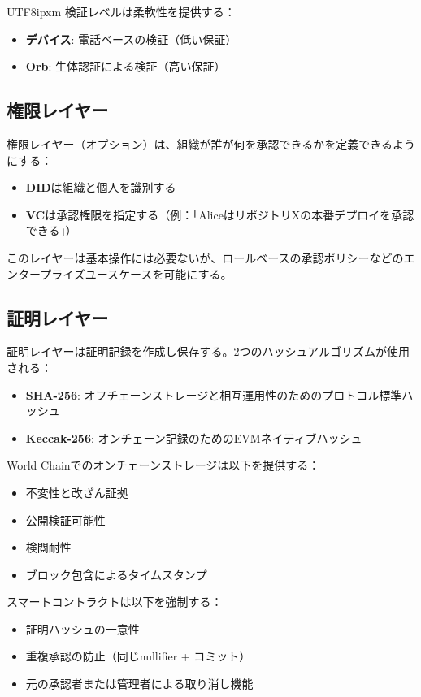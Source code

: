 \documentclass[a4paper,10pt]{article}
\begin{document}
\begin{CJK}{UTF8}{ipxm}
検証レベルは柔軟性を提供する：
\begin{itemize}
    \item \textbf{デバイス}: 電話ベースの検証（低い保証）
    \item \textbf{Orb}: 生体認証による検証（高い保証）
\end{itemize}

\subsection{権限レイヤー}

権限レイヤー（オプション）は、組織が誰が何を承認できるかを定義できるようにする：

\begin{itemize}
    \item \textbf{DID}は組織と個人を識別する
    \item \textbf{VC}は承認権限を指定する（例：「AliceはリポジトリXの本番デプロイを承認できる」）
\end{itemize}

このレイヤーは基本操作には必要ないが、ロールベースの承認ポリシーなどのエンタープライズユースケースを可能にする。

\subsection{証明レイヤー}

証明レイヤーは証明記録を作成し保存する。2つのハッシュアルゴリズムが使用される：

\begin{itemize}
    \item \textbf{SHA-256}: オフチェーンストレージと相互運用性のためのプロトコル標準ハッシュ
    \item \textbf{Keccak-256}: オンチェーン記録のためのEVMネイティブハッシュ
\end{itemize}

World Chainでのオンチェーンストレージは以下を提供する：
\begin{itemize}
    \item 不変性と改ざん証拠
    \item 公開検証可能性
    \item 検閲耐性
    \item ブロック包含によるタイムスタンプ
\end{itemize}

スマートコントラクトは以下を強制する：
\begin{itemize}
    \item 証明ハッシュの一意性
    \item 重複承認の防止（同じnullifier + コミット）
    \item 元の承認者または管理者による取り消し機能
\end{itemize}


\end{CJK}
\end{document}
